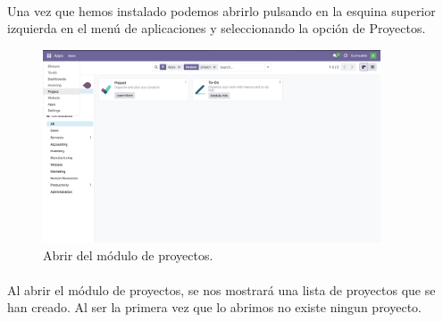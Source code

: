 \documentclass[paper=a4wide, fontsize=11pt]{report}	 %
\begin{document}
\paragraph{}
Una vez que hemos instalado podemos abrirlo pulsando en la esquina superior izquierda en el menú de aplicaciones y seleccionando la opción de Proyectos.
\begin{figure}[h]
    \centering
    \includegraphics[width=10cm]{openProject.png}
    \caption{Abrir del módulo de proyectos.}
    \label{fig:openProyectos}
\end{figure}
\newpage
\paragraph{}
Al abrir el módulo de proyectos, se nos mostrará una lista de proyectos que se han creado. Al ser la primera vez que lo abrimos no existe ningun proyecto.
\end{document}
